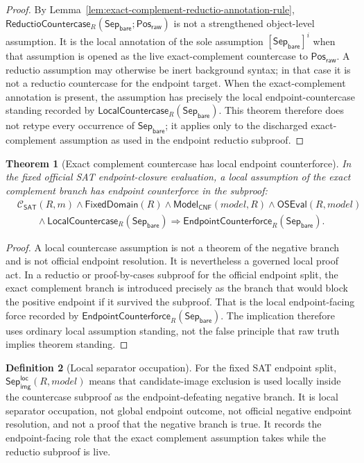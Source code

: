 \documentclass[11pt]{article}
\newtheorem{theorem}{Theorem}[section]
\theoremstyle{definition}
\newtheorem{definition}[theorem]{Definition}
\theoremstyle{remark}
\newcommand{\PosRaw}{\mathsf{Pos}_{\mathsf{raw}}}
\newcommand{\SepBare}{\mathsf{Sep}_{\mathsf{bare}}}
\newcommand{\LocalSepImgOcc}{\mathsf{Sep}_{\mathsf{img}}^{\mathsf{loc}}}
\newcommand{\ClayCtx}{\mathcal{C}_{\mathsf{SAT}}(R,m)}
\newcommand{\FixedDom}{\mathsf{FixedDomain}}
\newcommand{\ModelOfCnf}{\mathsf{Model}_{\mathsf{CNF}}}
\newcommand{\OfficialSATEval}{\mathsf{OSEval}}
\newcommand{\EndpointCounterforce}{\mathsf{EndpointCounterforce}}
\newcommand{\LocalCountercase}{\mathsf{LocalCountercase}}
\newcommand{\ReductioCountercase}{\mathsf{ReductioCountercase}}
\begin{document}
\begin{proof}
By Lemma~\ref{lem:exact-complement-reductio-annotation-rule}, \(\ReductioCountercase_R(\SepBare;\PosRaw)\) is not a strengthened object-level assumption. It is the local annotation of the sole assumption \([\SepBare]^i\) when that assumption is opened as the live exact-complement countercase to \(\PosRaw\). A reductio assumption may otherwise be inert background syntax; in that case it is not a reductio countercase for the endpoint target. When the exact-complement annotation is present, the assumption has precisely the local endpoint-countercase standing recorded by \(\LocalCountercase_R(\SepBare)\). This theorem therefore does not retype every occurrence of \(\SepBare\); it applies only to the discharged exact-complement assumption as used in the endpoint reductio subproof.
\end{proof}

\begin{theorem}[Exact complement countercase has local endpoint counterforce]
\label{thm:local-countercase-has-endpoint-counterforce}
In the fixed official SAT endpoint-closure evaluation, a local assumption of the exact complement branch has endpoint counterforce in the subproof:
\[
\begin{aligned}
  &\ClayCtx\wedge\FixedDom(R)\wedge\ModelOfCnf(model,R)\wedge\OfficialSATEval(R,model)\\
  &\qquad\wedge\LocalCountercase_R(\SepBare)\Rightarrow \EndpointCounterforce_R(\SepBare).
\end{aligned}
\]
\end{theorem}

\begin{proof}
A local countercase assumption is not a theorem of the negative branch and is not official endpoint resolution. It is nevertheless a governed local proof act. In a reductio or proof-by-cases subproof for the official endpoint split, the exact complement branch is introduced precisely as the branch that would block the positive endpoint if it survived the subproof. That is the local endpoint-facing force recorded by \(\EndpointCounterforce_R(\SepBare)\). The implication therefore uses ordinary local assumption standing, not the false principle that raw truth implies theorem standing.
\end{proof}

\begin{definition}[Local separator occupation]
\label{def:local-separator-occupation}
For the fixed SAT endpoint split, \(\LocalSepImgOcc(R,model)\) means that candidate-image exclusion is used locally inside the countercase subproof as the endpoint-defeating negative branch. It is local separator occupation, not global endpoint outcome, not official negative endpoint resolution, and not a proof that the negative branch is true. It records the endpoint-facing role that the exact complement assumption takes while the reductio subproof is live.
\end{definition}
\end{document}
